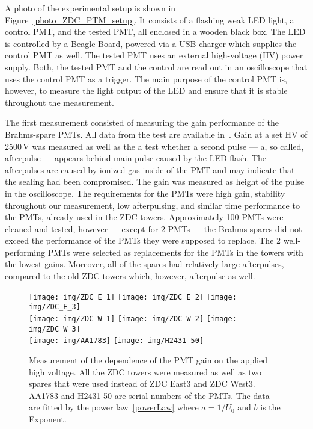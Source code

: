 A photo of the experimental setup is shown in Figure~\ref{photo_ZDC_PTM_setup}\@. It consists of a flashing weak LED light, a control PMT, and the tested PMT, all enclosed in a wooden black box. The LED is controlled by a Beagle Board, powered via a USB charger which supplies the control PMT as well. The tested PMT uses an external high-voltage (HV) power supply. Both, the tested PMT and the control are read out in an oscilloscope that uses the control PMT as a trigger. The main purpose of the control PMT is, however, to measure the light output of the LED and ensure that it is stable throughout the measurement.

The first measurement consisted of measuring the gain performance of the Brahms-spare PMTs. All data from the test are available in~\cite{PMT_spreadsheet}\@. Gain at a set HV of 2500$\,$V was measured as well as the a test whether a second pulse --- a, so called, afterpulse --- appears behind main pulse caused by the LED flash. The afterpulses are caused by ionized gas inside of the PMT and may indicate that the sealing had been compromised. The gain was measured as height of the pulse in the oscilloscope. The requirements for the PMTs were high gain, stability throughout our measurement, low afterpulsing, and similar time performance to the PMTs, already used in the ZDC towers. Approximately 100 PMTs were cleaned and tested, however --- except for 2 PMTs --- the Brahms spares did not exceed the performance of the PMTs they were supposed to replace. The 2 well-performing PMTs were selected as replacements for the PMTs in the towers with the lowest gains. Moreover, all of the spares had relatively large afterpulses, compared to the old ZDC towers which, however, afterpulse as well.


\begin{figure}[!htb]
\texttt{[image: img/ZDC\_E\_1]}
\texttt{[image: img/ZDC\_E\_2]}
\texttt{[image: img/ZDC\_E\_3]}\\
\texttt{[image: img/ZDC\_W\_1]}
\texttt{[image: img/ZDC\_W\_2]}
\texttt{[image: img/ZDC\_W\_3]}\\
\texttt{[image: img/AA1783]}
\texttt{[image: img/H2431-50]}
\caption[Measurement of the dependence of the PMT gain on the applied high voltage.]{\label{ZDCgains}Measurement of the dependence of the PMT gain on the applied high voltage. All the ZDC towers were measured as well as two spares that were used instead of ZDC East3 and ZDC West3\@. AA1783 and H2431-50 are serial numbers of the PMTs. The data are fitted by the power law~\eqref{powerLaw} where $a=1/U_0$ and $b$ is the Exponent.}
\end{figure}

